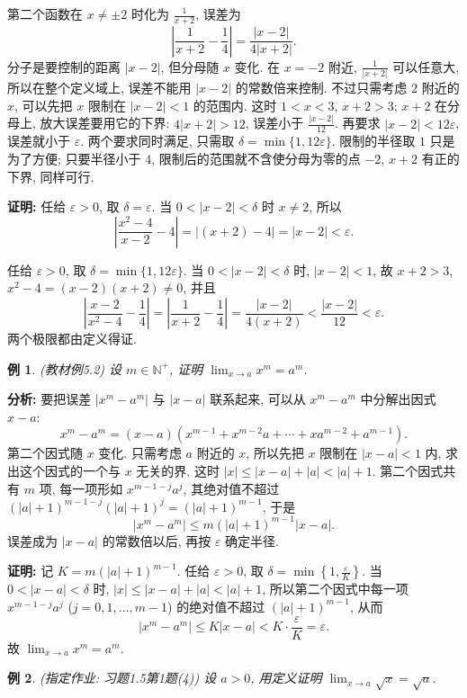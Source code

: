 \documentclass[UTF8,openany]{ctexbook}
\theoremstyle{chinesetextbook}
\newtheorem{example}{例}[section]
\newenvironment{cnproof}{\par\indent\textbf{证明:} \ignorespaces}{\par}
\begin{document}
第二个函数在 $x\ne\pm2$ 时化为 $\displaystyle\frac1{x+2}$, 误差为
\[
\left|\frac1{x+2}-\frac14\right|=\frac{|x-2|}{4|x+2|}.
\]
分子是要控制的距离 $|x-2|$, 但分母随 $x$ 变化. 在 $x=-2$ 附近, $\displaystyle\frac1{|x+2|}$ 可以任意大, 所以在整个定义域上, 误差不能用 $|x-2|$ 的常数倍来控制. 不过只需考虑 $2$ 附近的 $x$, 可以先把 $x$ 限制在 $|x-2|<1$ 的范围内. 这时 $1<x<3$, $x+2>3$; $x+2$ 在分母上, 放大误差要用它的下界: $4|x+2|>12$, 误差小于 $\displaystyle\frac{|x-2|}{12}$. 再要求 $|x-2|<12\varepsilon$, 误差就小于 $\varepsilon$. 两个要求同时满足, 只需取 $\delta=\min\{1,12\varepsilon\}$. 限制的半径取 $1$ 只是为了方便; 只要半径小于 $4$, 限制后的范围就不含使分母为零的点 $-2$, $x+2$ 有正的下界, 同样可行.
\begin{cnproof}
任给 $\varepsilon>0$, 取 $\delta=\varepsilon$. 当 $0<|x-2|<\delta$ 时 $x\ne2$, 所以
\[
\left|\frac{x^2-4}{x-2}-4\right|=|(x+2)-4|=|x-2|<\varepsilon.
\]

任给 $\varepsilon>0$, 取 $\delta=\min\{1,12\varepsilon\}$. 当 $0<|x-2|<\delta$ 时, $|x-2|<1$, 故 $x+2>3$, $x^2-4=(x-2)(x+2)\ne0$, 并且
\[
\left|\frac{x-2}{x^2-4}-\frac14\right|=\left|\frac1{x+2}-\frac14\right|=\frac{|x-2|}{4(x+2)}<\frac{|x-2|}{12}<\varepsilon.
\]
两个极限都由定义得证.
\end{cnproof}
\begin{example}\label{ex:5-2}
\textnormal{(教材例5.2)} 设 $m\in\mathbb N^+$, 证明 $\displaystyle\lim_{x\to a}x^m=a^m$.
\end{example}
\par\indent\textbf{分析:} 要把误差 $|x^m-a^m|$ 与 $|x-a|$ 联系起来, 可以从 $x^m-a^m$ 中分解出因式 $x-a$:
\[
x^m-a^m=(x-a)\left(x^{m-1}+x^{m-2}a+\cdots+xa^{m-2}+a^{m-1}\right).
\]
第二个因式随 $x$ 变化. 只需考虑 $a$ 附近的 $x$, 所以先把 $x$ 限制在 $|x-a|<1$ 内, 求出这个因式的一个与 $x$ 无关的界. 这时 $|x|\le|x-a|+|a|<|a|+1$. 第二个因式共有 $m$ 项, 每一项形如 $x^{m-1-j}a^j$, 其绝对值不超过 $(|a|+1)^{m-1-j}(|a|+1)^j=(|a|+1)^{m-1}$, 于是
\[
|x^m-a^m|\le m(|a|+1)^{m-1}|x-a|.
\]
误差成为 $|x-a|$ 的常数倍以后, 再按 $\varepsilon$ 确定半径.
\begin{cnproof}
记 $K=m(|a|+1)^{m-1}$. 任给 $\varepsilon>0$, 取 $\displaystyle\delta=\min\left\{1,\frac\varepsilon K\right\}$. 当 $0<|x-a|<\delta$ 时, $|x|\le|x-a|+|a|<|a|+1$, 所以第二个因式中每一项 $x^{m-1-j}a^j$ ($j=0,1,\ldots,m-1$) 的绝对值不超过 $(|a|+1)^{m-1}$, 从而
\[
|x^m-a^m|\le K|x-a|<K\cdot\frac\varepsilon K=\varepsilon.
\]
故 $\displaystyle\lim_{x\to a}x^m=a^m$.
\end{cnproof}
\begin{example}
\textnormal{(指定作业: 习题1.5第1题(4))} 设 $a>0$, 用定义证明 $\displaystyle\lim_{x\to a}\sqrt x=\sqrt a$.
\end{example}
\end{document}

